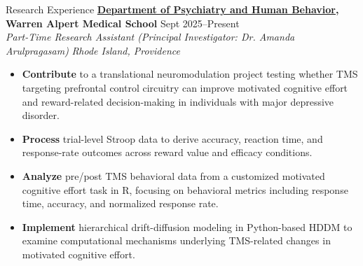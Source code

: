 \documentclass{resume} %
\begin{document}
\newpage
\begin{rSection}{Research Experience}
\textbf{\href{https://vivo.brown.edu/display/aarulpra}{Department of Psychiatry and Human Behavior}, Warren Alpert Medical School} \hfill{Sept 2025--Present} \\
\textit{Part-Time Research Assistant (Principal Investigator: Dr. Amanda Arulpragasam)} \hfill{\textit{Rhode Island, Providence}}
 \begin{itemize}
    \itemsep -5pt {} 
        \item \textbf{Contribute} to a translational neuromodulation project testing whether TMS targeting prefrontal control circuitry can improve motivated cognitive effort and reward-related decision-making in individuals with major depressive disorder. 
        \item \textbf{Process} trial-level Stroop data to derive accuracy, reaction time, and response-rate outcomes across reward value and efficacy conditions. 
        \item \textbf{Analyze} pre/post TMS behavioral data from a customized motivated cognitive effort task in R, focusing on behavioral metrics including response time, accuracy, and normalized response rate.
        \item \textbf{Implement} hierarchical drift-diffusion modeling in Python-based HDDM to examine computational mechanisms underlying TMS-related changes in motivated cognitive effort.
 \end{itemize}


\end{rSection}
\end{document}
